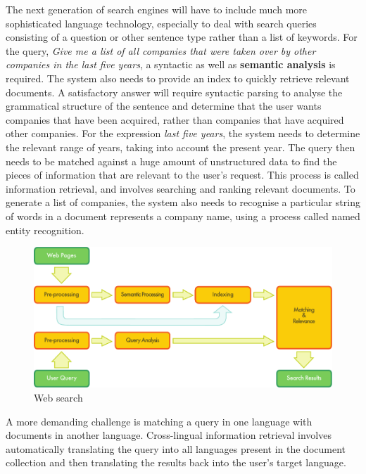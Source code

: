 \begin{multicols}{2}
The next generation of search engines will have to include much more
sophisticated language technology, especially to deal with search
queries consisting of a question or other sentence type rather than a
list of keywords. For the query, \textit{Give me a list of all
  companies that were taken over by other companies in the last five
  years}, a syntactic as well as \textbf{semantic analysis} is
required. The system also needs to provide an index to quickly
retrieve relevant documents. A satisfactory answer will require
syntactic parsing to analyse the grammatical structure of the sentence
and determine that the user wants companies that have been acquired,
rather than companies that have acquired other companies. For the
expression \textit{last five years}, the system needs to determine the
relevant range of years, taking into account the present year. The
query then needs to be matched against a huge amount of unstructured
data to find the pieces of information that are relevant to the user’s
request. This process is called information retrieval, and involves
searching and ranking relevant documents. To generate a list of
companies, the system also needs to recognise a particular string of
words in a document represents a company name, using a process called
named entity recognition.


\begin{figure}[htb]
  \center
  \includegraphics[width=\textwidth]{../_media/english/web_search_architecture}
  \caption{Web search}
  \label{fig:websearcharch_en}
 \end{figure}

A more demanding challenge is matching a query in one language with
documents in another language. Cross-lingual information retrieval
involves automatically translating the query into all languages
present in the document collection and then translating the results
back into the user's target language.


\end{multicols}
